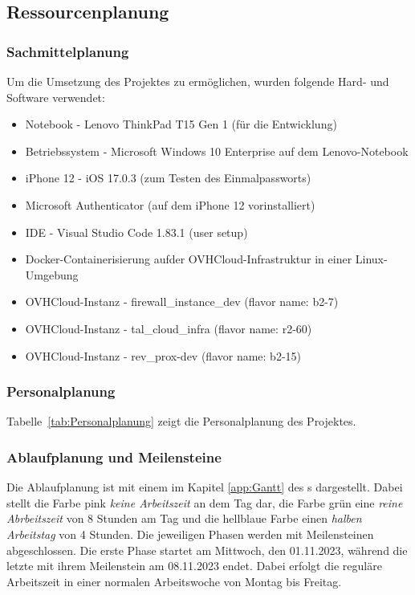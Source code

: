 \subsection{Ressourcenplanung}
\label{sec:Ressourcenplanung}

\subsubsection{Sachmittelplanung}
\label{sec:Sachmittelplanung}
Um die Umsetzung des Projektes zu ermöglichen, wurden folgende Hard- und Software verwendet:
\begin{itemize} [label=--]
	\item Notebook - Lenovo ThinkPad T15 Gen 1 (für die Entwicklung)
	\item Betriebssystem - Microsoft Windows 10 Enterprise auf dem Lenovo-Notebook
	\item iPhone 12 - iOS 17.0.3 (zum Testen des Einmalpassworts)
	\item Microsoft Authenticator (auf dem iPhone 12 vorinstalliert)
	\item IDE - Visual Studio Code 1.83.1 (user setup)
	\item Docker-Containerisierung aufder OVHCloud-Infrastruktur in einer Linux-Umgebung
	\item OVHCloud-Instanz - firewall\_instance\_dev (flavor name: b2-7)
	\item OVHCloud-Instanz - tal\_cloud\_infra (flavor name: r2-60)
	\item OVHCloud-Instanz - rev\_prox-dev (flavor name: b2-15)
\end{itemize}

\subsubsection{Personalplanung}
\label{sec:Personalplanung}
Tabelle~\ref{tab:Personalplanung} zeigt die Personalplanung des Projektes.

\subsubsection{Ablaufplanung und Meilensteine}
\label{sec:Ablaufplaung und Meilensteine}
Die Ablaufplanung ist mit einem  im Kapitel \ref{app:Gantt} des s dargestellt. 
Dabei stellt die Farbe pink \textit{keine Arbeitszeit} an dem Tag dar, die Farbe grün eine \textit{reine Abrbeitszeit} 
von 8 Stunden am Tag und die hellblaue Farbe einen \textit{halben Arbeitstag} von 4 Stunden. Die jeweiligen Phasen 
werden mit Meilensteinen abgeschlossen. Die erste Phase startet am Mittwoch, den 01.11.2023, während die letzte 
mit ihrem Meilenstein am 08.11.2023 endet. Dabei erfolgt die reguläre Arbeitszeit in einer normalen Arbeitswoche 
von Montag bis Freitag.

